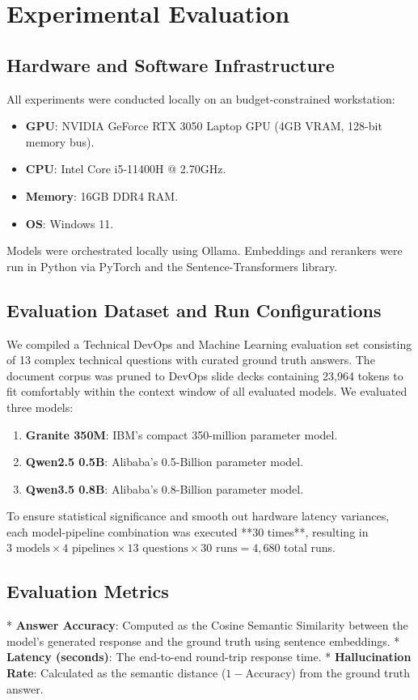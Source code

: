 \documentclass[conference]{IEEEtran}
\begin{document}
\section{Experimental Evaluation}
\subsection{Hardware and Software Infrastructure}
All experiments were conducted locally on an budget-constrained workstation:
\begin{itemize}
    \item \textbf{GPU}: NVIDIA GeForce RTX 3050 Laptop GPU (4GB VRAM, 128-bit memory bus).
    \item \textbf{CPU}: Intel Core i5-11400H @ 2.70GHz.
    \item \textbf{Memory}: 16GB DDR4 RAM.
    \item \textbf{OS}: Windows 11.
\end{itemize}
Models were orchestrated locally using Ollama. Embeddings and rerankers were run in Python via PyTorch and the Sentence-Transformers library.
\subsection{Evaluation Dataset and Run Configurations}
We compiled a Technical DevOps and Machine Learning evaluation set consisting of 13 complex technical questions with curated ground truth answers. The document corpus was pruned to DevOps slide decks containing 23,964 tokens to fit comfortably within the context window of all evaluated models.
We evaluated three models:
\begin{enumerate}
    \item \textbf{Granite 350M}: IBM's compact 350-million parameter model.
    \item \textbf{Qwen2.5 0.5B}: Alibaba's 0.5-Billion parameter model.
    \item \textbf{Qwen3.5 0.8B}: Alibaba's 0.8-Billion parameter model.
\end{enumerate}
To ensure statistical significance and smooth out hardware latency variances, each model-pipeline combination was executed **30 times**, resulting in $3 \text{ models} \times 4 \text{ pipelines} \times 13 \text{ questions} \times 30 \text{ runs} = 4,680$ total runs.
\subsection{Evaluation Metrics}
* \textbf{Answer Accuracy}: Computed as the Cosine Semantic Similarity between the model's generated response and the ground truth using sentence embeddings.
* \textbf{Latency (seconds)}: The end-to-end round-trip response time.
* \textbf{Hallucination Rate}: Calculated as the semantic distance ($1 - \text{Accuracy}$) from the ground truth answer.
\end{document}
